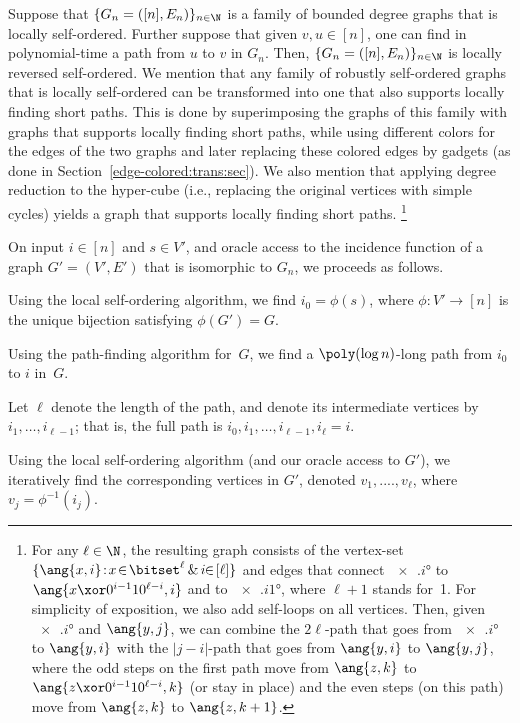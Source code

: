 %
%
\label{local-reversed-so:thm}
Suppose that $\{G_n=([n],E_n)\}_{n\in\N}$ is a family
of bounded degree graphs that is locally self-ordered.
Further suppose that given $v,u\in[n]$,
one can find in polynomial-time a path from $u$
to $v$ in $G_n$.
Then, $\{G_n=([n],E_n)\}_{n\in\N}$
is locally reversed self-ordered.
\ET
We mention that any family of robustly self-ordered graphs
that is locally self-ordered can be transformed
into one that also supports locally finding short paths.
This is done by superimposing the graphs of this family
with graphs that supports locally finding short paths,
while using different colors for the edges of the two graphs
and later replacing these colored edges by gadgets
(as done in Section~\ref{edge-colored:trans:sec}).
We also mention that applying degree reduction to the hyper-cube
(i.e., replacing the original vertices with simple cycles)
yields a graph that supports locally finding short paths.
\footnote{For any $\ell\in\N$, the resulting graph consists of the
vertex-set $\{\ang{x,i}\!:\!x\!\in\!\bitset^\ell\,\&\,i\!\!\in\![\ell]\}$
and edges that connect $\ang{x,i}$ to $\ang{x\xor0^{i-1}10^{\ell-i},i}$
and to $\ang{x,i+1}$, where $\ell+1$ stands for~1.
For simplicity of exposition, we also add self-loops on all vertices.
%
Then, given $\ang{x,i}$ and $\ang{y,j}$, we can combine the $2\ell$-path
that goes from $\ang{x,i}$ to $\ang{y,i}$ with the $|j-i|$-path
that goes from $\ang{y,i}$ to $\ang{y,j}$,
where the odd steps on the first path move from $\ang{z,k}$
to $\ang{z\xor0^{i-1}10^{\ell-i},k}$ (or stay in place)
and the even steps (on this path) move from $\ang{z,k}$ to $\ang{z,k+1}$.}
%
\medskip

\BPF
On input $i\in[n]$ and $s\in V'$,
and oracle access to the incidence function
of a graph $G'=(V',E')$ that is isomorphic to $G_n$,
we proceeds as follows.
\BE
\item
Using the local self-ordering algorithm,
we find $i_0=\phi(s)$, where $\phi:V'\to[n]$
is the unique bijection satisfying $\phi(G')=G$.

\item
Using the path-finding algorithm for~$G$,
we find a $\poly(\log n)$-long path from $i_0$ to $i$ in~$G$.

Let $\ell$ denote the length of the path,
and denote its intermediate vertices by $i_1,\ldots,i_{\ell-1}$;
that is, the full path is $i_0,i_1,\ldots,i_{\ell-1},i_\ell=i$.
\item
Using the local self-ordering algorithm (and our oracle access to $G'$),
we iteratively find the corresponding vertices in $G'$,
denoted $v_1,....,v_\ell$, where $v_j=\phi^{-1}(i_j)$.

